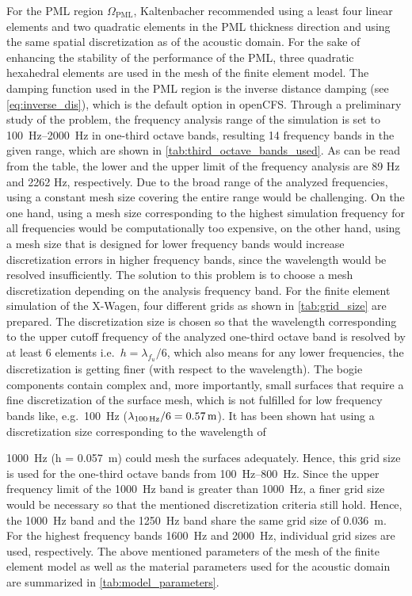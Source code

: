For the PML region $\Omega_{\text{PML}}$, Kaltenbacher \cite{KALTENBACHER_PML_2013} recommended using a least four linear elements and two quadratic elements in the PML thickness direction and using the same spatial discretization as of the acoustic domain. For the sake of enhancing the stability of the performance of the PML, three quadratic hexahedral elements are used in the mesh of the finite element model. The damping function used in the PML region is the inverse distance damping (see \cref{eq:inverse_dis}), which is the default option in openCFS.
Through a preliminary study of the problem, the frequency analysis range of the simulation is set to \SIrange{100}{2000}{\hertz} in one-third octave bands, resulting 14 frequency bands in the given range, which are shown in \cref{tab:third_octave_bands_used}. As can be read from the table, the lower and the upper limit of the frequency analysis are 89 Hz and 2262 Hz, respectively. Due to the broad range of the analyzed frequencies, using a constant mesh size covering the entire range would be challenging. On the one hand, using a mesh size corresponding to the highest simulation frequency for all frequencies would be computationally too expensive, on the other hand, using a mesh size that is designed for lower frequency bands would increase discretization errors in higher frequency bands, since the wavelength would be resolved insufficiently. The solution to this problem is to choose a mesh discretization depending on the analysis frequency band. For the finite element simulation of the X-Wagen, four different grids as shown in \cref{tab:grid_size} are prepared. The discretization size is chosen so that the wavelength corresponding to the upper cutoff frequency of the analyzed one-third octave band is resolved by at least 6 elements i.e.\ $h = \lambda_{f_u} / 6$, which also means for any lower frequencies, the discretization is getting finer (with respect to the wavelength). The bogie components contain complex and, more importantly, small surfaces that require a fine discretization of the surface mesh, which is not fulfilled for low frequency bands like, e.g.\ \SI{100}{\hertz} ($\lambda_{\text{\SI{100}{\hertz}}} / 6 = 0.57\,\text{m}$). It has been shown hat using a discretization size corresponding to the wavelength of {\SI{1000}{\hertz} (h = \SI{0.057}{\meter}) could mesh the surfaces adequately. Hence, this grid size is used for the one-third octave bands from \SIrange{100}{800}{\hertz}. Since the upper frequency limit of the \SI{1000}{\hertz} band is greater than \SI{1000}{\hertz}, a finer grid size would be necessary so that the mentioned discretization criteria still hold. Hence, the \SI{1000}{\hertz} band and the \SI{1250}{\hertz} band share the same grid size of \SI{0.036}{\meter}. For the highest frequency bands \SI{1600}{\hertz} and \SI{2000}{\hertz}, individual grid sizes are used, respectively.
The above mentioned parameters of the mesh of the finite element model as well as the material parameters used for the acoustic domain are summarized in \cref{tab:model_parameters}.

}

